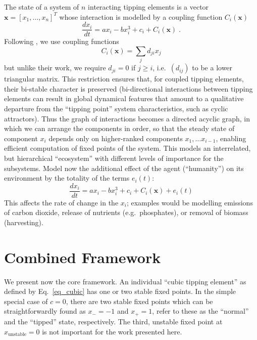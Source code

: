 \documentclass[letterpaper]{article}
\newcommand{\vectorsym}[1]{\ensuremath{\mathbf{#1}}}
\newcommand{\agentimpact}{\ensuremath{e}}
\begin{document}
The state of a system of $n$ interacting tipping elements is a vector
$\vectorsym{x} = [x_1, \ldots, x_n]^T$ whose interaction
is  modelled by
 a coupling function $C_i(\vectorsym{x})$
\begin{equation}
  \label{eq_coupled}
  \frac{dx_i}{dt} = ax_i - bx_i^3 + c_i + C_i(\vectorsym{x})\;.
\end{equation}
Following \citet{Klose2019_interactingtippingelements}, we use coupling
functions
\begin{equation}
  \label{eq_couplingfunction}
  C_i(\vectorsym{x}) = \sum_j d_{ji} x_j
\end{equation}
but unlike their work, we require $d_{ji} = 0$ if $j \ge i$,
i.e.\ $(d_{ij})$ to be a lower triangular matrix. This restriction
ensures that, for coupled tipping elements, their bi-stable character
is preserved (bi-directional interactions between tipping elements can
result in global dynamical features that amount to a qualitative
departure from the ``tipping point'' system characteristics, such as
cyclic attractors). Thus the graph of interactions becomes a directed
acyclic graph, in which we can arrange the components in order, so
that the steady state of component $x_i$ depends only on higher-ranked
components $x_1, \ldots x_{i-1}$, enabling efficient computation of
fixed points of the system. This models an interrelated, but
hierarchical ``ecosystem'' with different levels of importance for the
subsystems.  Model now the additional effect of the agent
(``humanity'') on its environment by the totality of the terms
$\agentimpact_i(t)$:
\begin{equation}
  \label{eq_coupledwithagent}
  \frac{dx_i}{dt} = ax_i - bx_i^3 + c_i + C_i(\vectorsym{x}) + \agentimpact_i(t)
\end{equation}
This affects the rate of change in the $x_i$; examples would be modelling
emissions of carbon dioxide, release of nutrients
(e.g.\ phosphates), or removal of biomass (harvesting).



\section{Combined Framework}
We present now the core framework.
An individual ``cubic tipping element'' as defined by
Eq.~\ref{eq_cubic} has one or two stable fixed points. In the simple
special case of $c = 0$, there are two stable fixed points which can
be straightforwardly found as $x_{-} = -1$ and $x_{+} = 1$,
\citet{Klose2019_interactingtippingelements} refer to these as the
``normal'' and the ``tipped'' state, respectively. The third, unstable
fixed point at $x_{\mathrm{unstable}} = 0$ is not important for the
work presented here.
\end{document}
